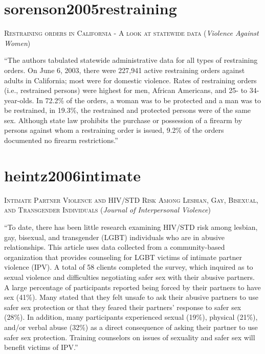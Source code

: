 \documentclass[]{tufte-handout}
\begin{document}
\section{\texorpdfstring{\textcolor[HTML]{5b0057}{sorenson2005restraining}}{}}\label{section-32}

\textsc{\large{Restraining orders in California - A look at statewide data}}
(\emph{Violence Against Women})

``The authors tabulated statewide administrative data for all types of
restraining orders. On June 6, 2003, there were 227,941 active
restraining orders against adults in California; most were for domestic
violence. Rates of restraining orders (i.e., restrained persons) were
highest for men, African Americans, and 25- to 34-year-olds. In 72.2\%
of the orders, a woman was to be protected and a man was to be
restrained, in 19.3\%, the restrained and protected persons were of the
same sex. Although state law prohibits the purchase or possession of a
firearm by persons against whom a restraining order is issued, 9.2\% of
the orders documented no firearm restrictions.''

\section{\texorpdfstring{\textcolor[HTML]{5b0057}{heintz2006intimate}}{}}\label{section-33}

\textsc{\large{Intimate Partner Violence and HIV/STD Risk Among Lesbian, Gay, Bisexual, and Transgender Individuals}}
(\emph{Journal of Interpersonal Violence})

``To date, there has been little research examining HIV/STD risk among
lesbian, gay, bisexual, and transgender (LGBT) individuals who are in
abusive relationships. This article uses data collected from a
community-based organization that provides counseling for LGBT victims
of intimate partner violence (IPV). A total of 58 clients completed the
survey, which inquired as to sexual violence and difficulties
negotiating safer sex with their abusive partners. A large percentage of
participants reported being forced by their partners to have sex (41\%).
Many stated that they felt unsafe to ask their abusive partners to use
safer sex protection or that they feared their partners' response to
safer sex (28\%). In addition, many participants experienced sexual
(19\%), physical (21\%), and/or verbal abuse (32\%) as a direct
consequence of asking their partner to use safer sex protection.
Training counselors on issues of sexuality and safer sex will benefit
victims of IPV.''
\end{document}
